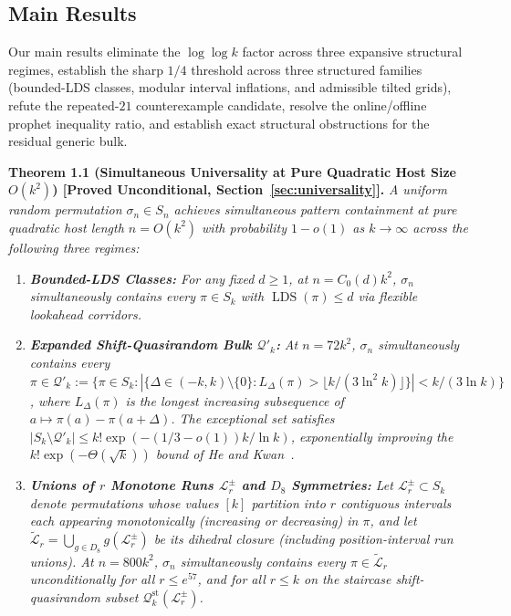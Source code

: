 \documentclass[
  11pt,
]{article}
\providecommand{\tightlist}{%
  \setlength{\itemsep}{0pt}\setlength{\parskip}{0pt}}
\begin{document}
\subsection{Main Results}\label{main-contributions}

Our main results eliminate the $\log\log k$ factor across three expansive structural regimes, establish the sharp $1/4$ threshold across three structured families (bounded-LDS classes, modular interval inflations, and admissible tilted grids), refute the repeated-$21$ counterexample candidate, resolve the online/offline prophet inequality ratio, and establish exact structural obstructions for the residual generic bulk.

\textbf{Theorem 1.1 (Simultaneous Universality at Pure Quadratic Host Size $O(k^2)$) [Proved Unconditional, Section~\ref{sec:universality}].}
\emph{A uniform random permutation $\sigma_n \in S_n$ achieves simultaneous pattern containment at pure quadratic host length $n = O(k^2)$ with probability $1 - o(1)$ as $k \to \infty$ across the following three regimes:}
\begin{enumerate}
\def\labelenumi{(\alph{enumi})}
\tightlist
\item \emph{\textbf{Bounded-LDS Classes:} For any fixed $d \ge 1$, at $n = C_0(d) k^2$, $\sigma_n$ simultaneously contains every $\pi \in S_k$ with $\operatorname{LDS}(\pi) \le d$ via flexible lookahead corridors.}
\item \emph{\textbf{Expanded Shift-Quasirandom Bulk $\mathcal{Q}'_k$:} At $n = 72 k^2$, $\sigma_n$ simultaneously contains every $\pi \in \mathcal{Q}'_k := \{\pi \in S_k : |\{\Delta \in (-k, k)\setminus\{0\} : L_\Delta(\pi) > \lfloor k/(3\ln^2 k)\rfloor\}| < k/(3\ln k)\}$, where $L_\Delta(\pi)$ is the longest increasing subsequence of $a \mapsto \pi(a) - \pi(a+\Delta)$. The exceptional set satisfies $|S_k \setminus \mathcal{Q}'_k| \le k! \exp(-(1/3 - o(1))k/\ln k)$, exponentially improving the $k! \exp(-\Theta(\sqrt{k}))$ bound of He and Kwan~\cite{ref-HK20}.}
\item \emph{\textbf{Unions of $r$ Monotone Runs $\mathcal{L}^\pm_r$ and $D_8$ Symmetries:} Let $\mathcal{L}^\pm_r \subset S_k$ denote permutations whose values $[k]$ partition into $r$ contiguous intervals each appearing monotonically (increasing or decreasing) in $\pi$, and let $\widetilde{\mathcal{L}}_r = \bigcup_{g \in D_8} g(\mathcal{L}^\pm_r)$ be its dihedral closure (including position-interval run unions). At $n = 800 k^2$, $\sigma_n$ simultaneously contains every $\pi \in \widetilde{\mathcal{L}}_r$ unconditionally for all $r \le e^{57}$, and for all $r \le k$ on the staircase shift-quasirandom subset $\mathcal{Q}^{\mathrm{st}}_k(\mathcal{L}^\pm_r)$.}
\end{enumerate}
\end{document}
